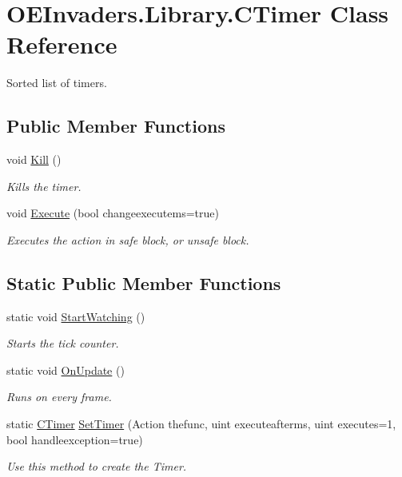 \hypertarget{class_o_e_invaders_1_1_library_1_1_c_timer}{}\section{O\+E\+Invaders.\+Library.\+C\+Timer Class Reference}
\label{class_o_e_invaders_1_1_library_1_1_c_timer}


Sorted list of timers.  


\subsection*{Public Member Functions}
\begin{DoxyCompactItemize}
\item 
void \mbox{\hyperlink{class_o_e_invaders_1_1_library_1_1_c_timer_a4a16830ba5bca4b347d77b292a1fa953}{Kill}} ()
\begin{DoxyCompactList}\small\item\em Kills the timer. \end{DoxyCompactList}\item 
void \mbox{\hyperlink{class_o_e_invaders_1_1_library_1_1_c_timer_aa4c5642c3ca0c61bea0491b6b0ad9856}{Execute}} (bool changeexecutems=true)
\begin{DoxyCompactList}\small\item\em Executes the action in safe block, or unsafe block. \end{DoxyCompactList}\end{DoxyCompactItemize}
\subsection*{Static Public Member Functions}
\begin{DoxyCompactItemize}
\item 
static void \mbox{\hyperlink{class_o_e_invaders_1_1_library_1_1_c_timer_aefcd9a330cc64166743bc0fa48a49f0d}{Start\+Watching}} ()
\begin{DoxyCompactList}\small\item\em Starts the tick counter. \end{DoxyCompactList}\item 
static void \mbox{\hyperlink{class_o_e_invaders_1_1_library_1_1_c_timer_a81722581ec5aee35dadfff0ed6a1839e}{On\+Update}} ()
\begin{DoxyCompactList}\small\item\em Runs on every frame. \end{DoxyCompactList}\item 
static \mbox{\hyperlink{class_o_e_invaders_1_1_library_1_1_c_timer}{C\+Timer}} \mbox{\hyperlink{class_o_e_invaders_1_1_library_1_1_c_timer_ac03393ba60d4802cad27553e8d399559}{Set\+Timer}} (Action thefunc, uint executeafterms, uint executes=1, bool handleexception=true)
\begin{DoxyCompactList}\small\item\em Use this method to create the Timer. \end{DoxyCompactList}\end{DoxyCompactItemize}

